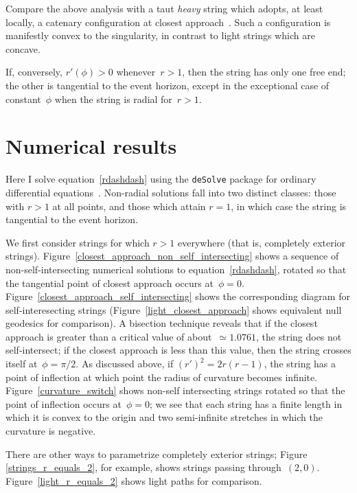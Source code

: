 \documentclass[prb,preprint]{revtex4-1}
\begin{document}
Compare the above analysis with a taut {\em heavy} string which
adopts, at least locally, a catenary configuration at closest
approach~\cite{nguyen2007}.  Such a configuration is manifestly convex
to the singularity, in contrast to light strings which are concave.

If, conversely, $r'(\phi)>0$ whenever~$r>1$, then the string has only
one free end; the other is tangential to the event horizon, except in
the exceptional case of constant~$\phi$ when the string is radial
for~$r>1$.

\section{Numerical results}

Here I solve equation~\ref{rdashdash} using the \verb+deSolve+ package
for ordinary differential equations~\cite{soetart2010}.  Non-radial
solutions fall into two distinct classes: those with $r>1$ at all
points, and those which attain $r=1$, in which case the string is
tangential to the event horizon.

We first consider strings for which $r>1$ everywhere (that is,
completely exterior strings).
Figure~\ref{closest_approach_non_self_intersecting} shows a sequence
of non-self-intersecting numerical solutions to
equation~\ref{rdashdash}, rotated so that the tangential point of
closest approach occurs at~$\phi=0$.
Figure~\ref{closest_approach_self_intersecting} shows the
corresponding diagram for self-interesecting strings
(Figure~\ref{light_closest_approach} shows equivalent null geodesics
for comparison).  A bisection technique reveals that if the closest
approach is greater than a critical value of about~$\simeq 1.0761$,
the string does not self-intersect; if the closest approach is less
than this value, then the string crosses itself at~$\phi=\pi/2$.  As
discussed above, if $\left(r'\right)^2=2r(r-1)$, the string has a
point of inflection at which point the radius of curvature becomes
infinite.  Figure~\ref{curvature_switch} shows non-self intersecting
strings rotated so that the point of inflection occurs at~$\phi=0$; we
see that each string has a finite length in which it is convex to the
origin and two semi-infinite stretches in which the curvature is
negative.

There are other ways to parametrize completely exterior strings;
Figure \ref{strings_r_equals_2}, for example, shows strings passing
through~$(2,0)$.  Figure~\ref{light_r_equals_2} shows light paths for
comparison.
\end{document}
